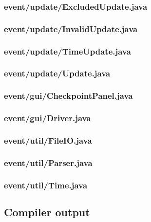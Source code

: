 \documentclass[a4paper, twoside]{article}
\begin{document}
\subsubsection{event/update/ExcludedUpdate.java}

\subsubsection{event/update/InvalidUpdate.java}

\subsubsection{event/update/TimeUpdate.java}

\subsubsection{event/update/Update.java}

\subsubsection{event/gui/CheckpointPanel.java}

\subsubsection{event/gui/Driver.java}

\subsubsection{event/util/FileIO.java}

\subsubsection{event/util/Parser.java}

\subsubsection{event/util/Time.java}

\subsection{Compiler output}
\lstset{tabsize=2, breaklines=true, breakatwhitespace=false, basicstyle=\ttfamily}

\lstset{tabsize=2, breaklines=true, breakatwhitespace=true, basicstyle=\ttfamily}
\end{document}
